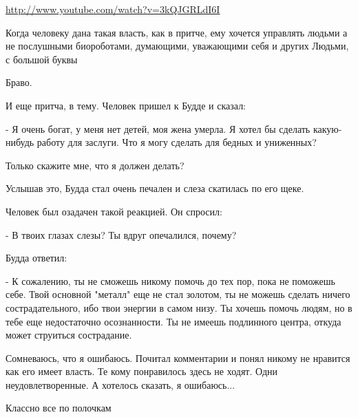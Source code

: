 \begin{itemize}
\url{http://www.youtube.com/watch?v=3kQJGRLdI6I}


Когда человеку дана такая власть, как в притче, ему хочется управлять людьми а
не послушными биороботами, думающими, уважающими себя и других Людьми, с
большой буквы


Браво.

И еще притча, в тему. Человек пришел к Будде и сказал:

- Я очень богат, у меня нет детей, моя жена умерла. Я хотел бы сделать
какую-нибудь работу для заслуги. Что я могу сделать для бедных и униженных?

Только скажите мне, что я должен делать?

Услышав это, Будда стал очень печален и слеза скатилась по его щеке.

Человек был озадачен такой реакцией. Он спросил:

- В твоих глазах слезы? Ты вдруг опечалился, почему?

Будда ответил:

- К сожалению, ты не сможешь никому помочь до тех пор, пока не поможешь себе.
Твой основной "металл" еще не стал золотом, ты не можешь сделать ничего
сострадательного, ибо твои энергии в самом низу. Ты хочешь помочь людям, но в
тебе еще недостаточно осознанности. Ты не имеешь подлинного центра, откуда
может струиться сострадание.


Сомневаюсь, что я ошибаюсь. Почитал комментарии и понял никому не нравится как
его имеет власть. Те кому понравилось здесь не ходят. Одни неудовлетворенные. А
хотелось сказать, я ошибаюсь...

Классно все по полочкам



\end{itemize}
